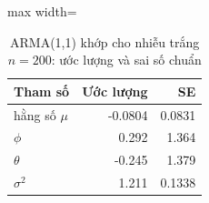 \begin{table}[H]
\centering\footnotesize
\caption{ARMA(1,1) khớp cho nhiễu trắng $n=200$: ước lượng và sai số chuẩn}\label{tab:tab_b11_10_overparameterized}
\begin{adjustbox}{max width=\linewidth}
\begin{tabular}{|l|r|r|}
\toprule
Tham số & Ước lượng & SE \\
\midrule
hằng số $\mu$ & -0.0804 & 0.0831 \\
$\phi$ & 0.292 & 1.364 \\
$\theta$ & -0.245 & 1.379 \\
$\sigma^{2}$ & 1.211 & 0.1338 \\
\bottomrule
\end{tabular}
\end{adjustbox}
\end{table}
